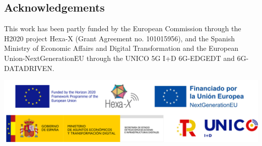 \documentclass[a0,portrait]{a0poster}
\begin{document}
\begin{multicols}{2}



\printbibliography





\section*{Acknowledgements}
This work has been partly funded by the European Commission through the H2020 project Hexa-X (Grant Agreement no. 101015956), and the Spanish Ministry of Economic Affairs and Digital Transformation and the European Union-NextGenerationEU through the UNICO 5G I+D 6G-EDGEDT and 6G-DATADRIVEN.

\begin{center}%
    \includegraphics[width=.7\linewidth]{figures/ack-logos.png}
    \label{fig:foreco}
\end{center}%

\end{multicols}



\end{document}
